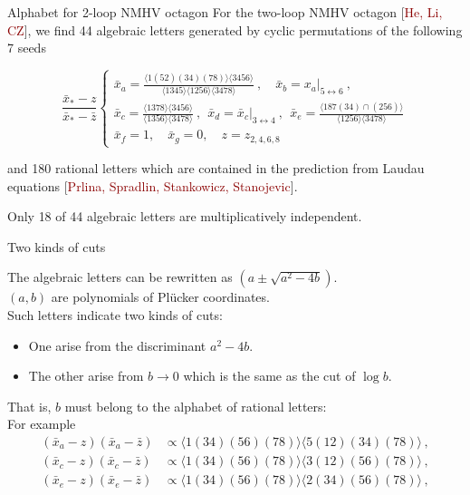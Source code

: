 \documentclass[10pt]{beamer}
\begin{document}
\begin{frame}{Alphabet for 2-loop NMHV octagon}
  For the two-loop NMHV octagon  {\footnotesize{[\textcolor{darkred}{He, Li, CZ}]}}, we find \alert{44} algebraic letters generated by cyclic permutations of the following 7 seeds

    \begin{equation*}
    \frac{\bar{x}_{*}-z}{\bar{x}_{*}-\bar{z}} \begin{cases}
      \bar{x}_{a}= \frac{\langle 1(52)(34)(78)\rangle\langle 3456\rangle}{\langle 1345\rangle\langle 1256\rangle\langle 3478\rangle} \:, \quad \bar{x}_{b}=x_{a}\vert_{5\leftrightarrow 6}\:,\\
      \bar{x}_{c}=\frac{\langle 1378\rangle\langle3456\rangle}{\langle1356\rangle \langle3478\rangle} \:,\:\: \bar{x}_{d}=\bar{x}_{c}\vert_{3\leftrightarrow4} \:,\: \:\bar{x}_{e}=\frac{\langle  187(34)\cap(256)\rangle}{\langle1256\rangle\langle 3478\rangle}\nonumber
      \\ \bar{x}_{f}=1,\quad \bar{x}_{g}=0,\quad z=z_{2,4,6,8}
    \end{cases}
  \end{equation*} 

  and \alert{180} rational letters which are contained in the prediction from Laudau equations {\footnotesize{[\textcolor{darkred}{Prlina, Spradlin, Stankowicz, Stanojevic}]}}. 

 Only \alert{18} of \alert{44} algebraic letters are multiplicatively independent.
\end{frame}

\begin{frame}{Two kinds of cuts}
  
  The algebraic letters can be rewritten as $(a\pm \sqrt{a^{2}-4b})$.\\
  $(a,b)$ are polynomials of Pl\"{u}cker coordinates. \\
  Such letters indicate two kinds of cuts:
  \begin{itemize}
    \item One arise from the discriminant $a^{2}-4b$.
    \item The other arise from $b\to0$ which is the same as the cut of $\log b$. 
  \end{itemize}
That is, $b$ must belong to the alphabet of \alert{rational letters}:\\
For example 
\begin{align*}
  (\bar{x}_a-z)(\bar{x}_a-\bar{z})&\propto \langle 1(34)(56)(78)\rangle \langle 5 (12)(34)(78)\rangle\,,\\
  (\bar{x}_c-z)(\bar{x}_c-\bar{z})&\propto \langle 1(34)(56)(78)\rangle \langle 3 (12)(56)(78)\rangle\,,\\
  (\bar{x}_e-z)(\bar{x}_e-\bar{z})&\propto \langle 1(34)(56)(78) \rangle \langle 2 (34)(56)(78)\rangle\,,
\end{align*}

\end{frame}
\end{document}
